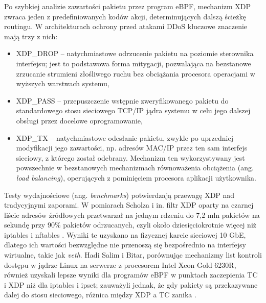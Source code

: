 \documentclass[a4paper,12pt]{article}
\begin{document}
Po szybkiej analizie zawartości pakietu przez program eBPF, mechanizm XDP zwraca jeden z predefiniowanych kodów akcji, determinujących dalszą ścieżkę routingu. W architekturach ochrony przed atakami DDoS kluczowe znaczenie mają trzy z nich:
\begin{itemize}
    \item XDP\_DROP – natychmiastowe odrzucenie pakietu na poziomie sterownika interfejsu; jest to podstawowa forma mitygacji, pozwalająca na bezstanowe zrzucanie strumieni złośliwego ruchu bez obciążania procesora operacjami w wyższych warstwach systemu,
    \item XDP\_PASS – przepuszczenie wstępnie zweryfikowanego pakietu do standardowego stosu sieciowego TCP/IP jądra systemu w celu jego dalszej obsługi przez docelowe oprogramowanie,
    \item XDP\_TX – natychmiastowe odesłanie pakietu, zwykle po uprzedniej modyfikacji jego zawartości, np. adresów MAC/IP przez ten sam interfejs sieciowy, z którego został odebrany. Mechanizm ten wykorzystywany jest powszechnie w bezstanowych mechanizmach równoważenia obciążenia (ang. \textit{load balancing}), operujących z pominięciem procesora aplikacji użytkownika.
\end{itemize}
Testy wydajnościowe (ang. \textit{benchmarks}) potwierdzają przewagę XDP nad tradycyjnymi zaporami. W pomiarach Scholza i in. filtr XDP oparty na czarnej liście adresów źródłowych przetwarzał na jednym rdzeniu do 7,2 mln pakietów na sekundę przy 90\% pakietów odrzucanych, czyli około dziesięciokrotnie więcej niż iptables i nftables \cite{scholz2018performance}. Wyniki te uzyskano na fizycznej karcie sieciowej 10 GbE, dlatego ich wartości bezwzględne nie przenoszą się bezpośrednio na interfejsy wirtualne, takie jak \textit{veth}. Hadi Salim i Bitar, porównując mechanizmy list kontroli dostępu w jądrze Linux na serwerze z procesorem Intel Xeon Gold 6230R, również uzyskali lepsze wyniki dla programów eBPF w punktach zaczepienia TC i XDP niż dla iptables i ipset; zauważyli jednak, że gdy pakiety są przekazywane dalej do stosu sieciowego, różnica między XDP a TC zanika \cite{hadisalim2021acl}.
\end{document}
